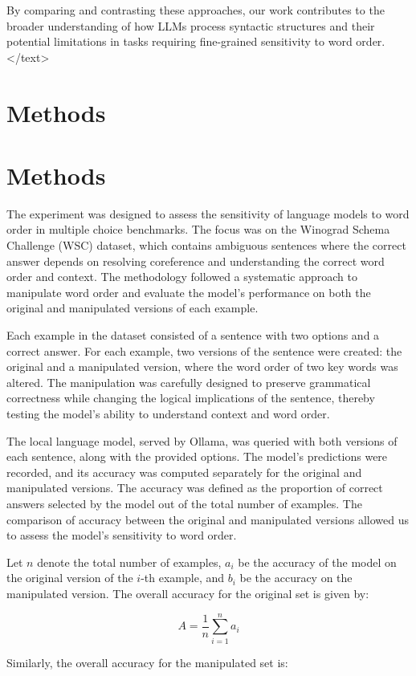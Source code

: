 \documentclass{article}
\begin{document}
By comparing and contrasting these approaches, our work contributes to the broader understanding of how LLMs process syntactic structures and their potential limitations in tasks requiring fine-grained sensitivity to word order.
</text>
\section{Methods}
\section{Methods}

The experiment was designed to assess the sensitivity of language models to word order in multiple choice benchmarks. The focus was on the Winograd Schema Challenge (WSC) dataset, which contains ambiguous sentences where the correct answer depends on resolving coreference and understanding the correct word order and context. The methodology followed a systematic approach to manipulate word order and evaluate the model's performance on both the original and manipulated versions of each example.

Each example in the dataset consisted of a sentence with two options and a correct answer. For each example, two versions of the sentence were created: the original and a manipulated version, where the word order of two key words was altered. The manipulation was carefully designed to preserve grammatical correctness while changing the logical implications of the sentence, thereby testing the model's ability to understand context and word order.

The local language model, served by Ollama, was queried with both versions of each sentence, along with the provided options. The model's predictions were recorded, and its accuracy was computed separately for the original and manipulated versions. The accuracy was defined as the proportion of correct answers selected by the model out of the total number of examples. The comparison of accuracy between the original and manipulated versions allowed us to assess the model's sensitivity to word order.

Let $ n $ denote the total number of examples, $ a_i $ be the accuracy of the model on the original version of the $ i $-th example, and $ b_i $ be the accuracy on the manipulated version. The overall accuracy for the original set is given by:

$$
A = \frac{1}{n} \sum_{i=1}^{n} a_i
$$

Similarly, the overall accuracy for the manipulated set is:
\end{document}
